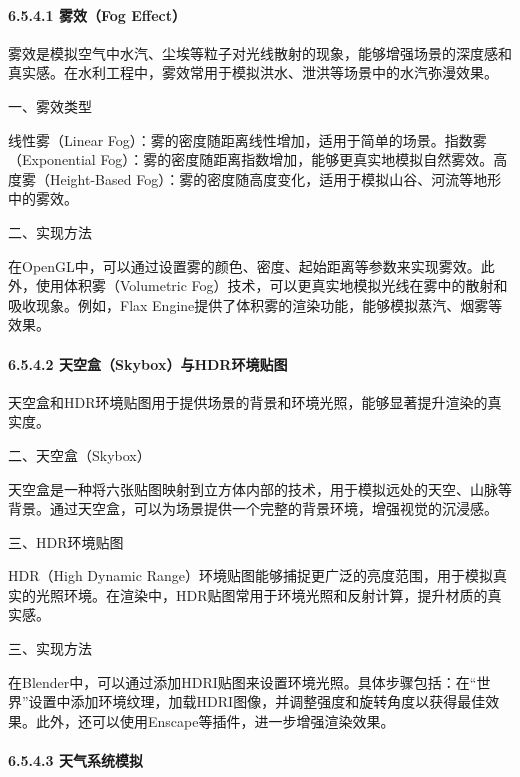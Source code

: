\hypertarget{ux96feux6548fog-effect}{%
\paragraph{6.5.4.1 雾效（Fog Effect）}\label{ux96feux6548fog-effect}}

雾效是模拟空气中水汽、尘埃等粒子对光线散射的现象，能够增强场景的深度感和真实感。在水利工程中，雾效常用于模拟洪水、泄洪等场景中的水汽弥漫效果。

一、雾效类型

线性雾（Linear Fog）：雾的密度随距离线性增加，适用于简单的场景。指数雾（Exponential Fog）：雾的密度随距离指数增加，能够更真实地模拟自然雾效。高度雾（Height-Based Fog）：雾的密度随高度变化，适用于模拟山谷、河流等地形中的雾效。

二、实现方法

在OpenGL中，可以通过设置雾的颜色、密度、起始距离等参数来实现雾效。此外，使用体积雾（Volumetric Fog）技术，可以更真实地模拟光线在雾中的散射和吸收现象。例如，Flax Engine提供了体积雾的渲染功能，能够模拟蒸汽、烟雾等效果。

\hypertarget{ux5929ux7a7aux76d2skyboxux4e0ehdrux73afux5883ux8d34ux56fe}{%
\paragraph{6.5.4.2 天空盒（Skybox）与HDR环境贴图}\label{ux5929ux7a7aux76d2skyboxux4e0ehdrux73afux5883ux8d34ux56fe}}

天空盒和HDR环境贴图用于提供场景的背景和环境光照，能够显著提升渲染的真实度。

二、天空盒（Skybox）

天空盒是一种将六张贴图映射到立方体内部的技术，用于模拟远处的天空、山脉等背景。通过天空盒，可以为场景提供一个完整的背景环境，增强视觉的沉浸感。

三、HDR环境贴图

HDR（High Dynamic Range）环境贴图能够捕捉更广泛的亮度范围，用于模拟真实的光照环境。在渲染中，HDR贴图常用于环境光照和反射计算，提升材质的真实感。

三、实现方法

在Blender中，可以通过添加HDRI贴图来设置环境光照。具体步骤包括：在``世界''设置中添加环境纹理，加载HDRI图像，并调整强度和旋转角度以获得最佳效果。此外，还可以使用Enscape等插件，进一步增强渲染效果。

\hypertarget{ux5929ux6c14ux7cfbux7edfux6a21ux62df}{%
\paragraph{6.5.4.3 天气系统模拟}\label{ux5929ux6c14ux7cfbux7edfux6a21ux62df}}

